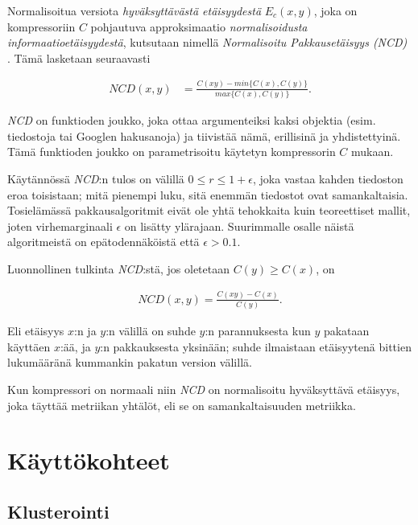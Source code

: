 \documentclass[11pt,finnish]{tktltiki2}
\theoremstyle{definition}
\theoremstyle{remark}
\begin{document}
  Normalisoitua versiota \emph{hyväksyttävästä etäisyydestä} $E_c(x,y)$, joka on kompressoriin $C$ pohjautuva approksimaatio \emph{normalisoidusta informaatioetäisyydestä}, kutsutaan nimellä \emph{Normalisoitu Pakkausetäisyys (NCD)} \cite{CV05}. Tämä lasketaan seuraavasti

  \begin{align}
    NCD(x,y) &= \frac{C(xy)-min\{C(x),C(y)\}}{max\{C(x),C(y)\}}.
  \end{align}

  \emph{NCD} on funktioden joukko, joka ottaa argumenteiksi kaksi objektia (esim. tiedostoja tai Googlen hakusanoja) ja tiivistää nämä, erillisinä ja yhdistettyinä. Tämä funktioden joukko on parametrisoitu käytetyn kompressorin $C$ mukaan.

  Käytännössä \emph{NCD}:n tulos on välillä $0 \leq r \leq 1+ \epsilon$, joka vastaa kahden tiedoston eroa toisistaan; mitä pienempi luku, sitä enemmän tiedostot ovat samankaltaisia. Tosielämässä pakkausalgoritmit eivät ole yhtä tehokkaita kuin teoreettiset mallit, joten virhemarginaali $\epsilon$ on lisätty ylärajaan. Suurimmalle osalle näistä algoritmeistä on epätodennäköistä että  $\epsilon > 0.1$.

  Luonnollinen tulkinta \emph{NCD}:stä, jos oletetaan $C(y) \geq C(x)$, on

  \begin{align}
    NCD(x,y) = \frac{C(xy)-C(x)}{C(y)}.
 \end{align}

  Eli etäisyys $x$:n ja $y$:n välillä on suhde $y$:n parannuksesta kun $y$ pakataan käyttäen $x$:ää, ja $y$:n pakkauksesta yksinään; suhde ilmaistaan etäisyytenä bittien lukumääränä kummankin pakatun version välillä.

  Kun kompressori on normaali niin \emph{NCD} on normalisoitu hyväksyttävä etäisyys, joka täyttää metriikan yhtälöt, eli se on samankaltaisuuden metriikka.



\section{Käyttökohteet} %
\label{sec:k_ytt_kohteet}
  \subsection{Klusterointi} %
  \label{sub:klusterointi}
\end{document}
